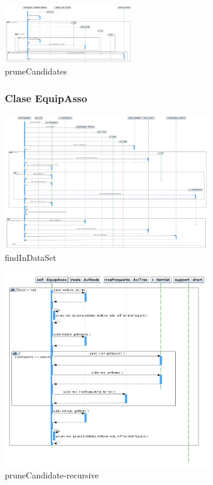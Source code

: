 \newpage
\begin{figure}
\centering
\includegraphics[angle=90, width=0.5\textwidth]{imgsSecuencia/Apriori/pruneCandidates.png}
\caption{pruneCandidates}
\end{figure}
\newpage

\begin{figure}
\subsubsection{Clase EquipAsso}
\centering
\includegraphics[angle=90, width=0.8\textwidth]{imgsSecuencia/EquipAsso/findInDataSet.png}
\caption{findInDataSet}
\end{figure}
\newpage
\begin{figure}
\centering
\includegraphics[width=0.8\textwidth]{imgsSecuencia/EquipAsso/pruneCandidate-recursive.png}
\caption{pruneCandidate-recursive}
\end{figure}
